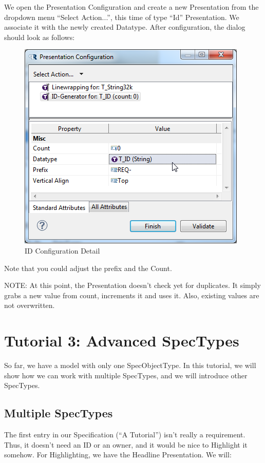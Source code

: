 We open the Presentation Configuration and create a new Presentation
from the dropdown menu ``Select Action...'', this time of type ``Id''
Presentation. We associate it with the newly created Datatype. After
configuration, the dialog should look as follows:

\begin{figure}[h!]
\centering      
\includegraphics[width=0.8\linewidth]{../rmf-images/pror_id_presentation.png}      
\caption{ID Configuration Detail}      
\label{fig:idConfig}
\end{figure}

Note that you could adjust the prefix and the Count.

NOTE: At this point, the Presentation doesn't check yet for duplicates.
It simply grabs a new value from count, increments it and uses it. Also,
existing values are not overwritten.

\section{Tutorial 3: Advanced SpecTypes}

So far, we have a model with only one SpecObjectType. In this tutorial,
we will show how we can work with multiple SpecTypes, and we will
introduce other SpecTypes.

\subsection{Multiple SpecTypes}

The first entry in our Specification (``A \pror{} Tutorial'') isn't really
a requirement. Thus, it doesn't need an ID or an owner, and it would be
nice to Highlight it somehow. For Highlighting, we have the Headline
Presentation. We will:

